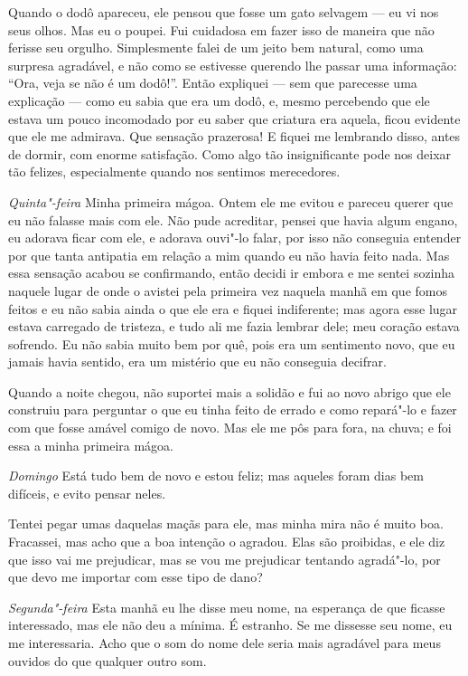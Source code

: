 Quando o dodô apareceu, ele pensou que fosse um gato selvagem --- eu vi nos seus
olhos. Mas eu o poupei. Fui cuidadosa em fazer isso de maneira que não
ferisse seu orgulho. Simplesmente falei de um jeito bem natural, como uma
surpresa agradável, e não como se estivesse querendo lhe passar uma informação:
“Ora, veja se não é um dodô!”. Então expliquei --- sem que parecesse uma
explicação --- como eu sabia que era um dodô, e, mesmo percebendo que ele estava um
pouco incomodado por eu saber que criatura era aquela, ficou evidente que ele
me admirava. Que sensação prazerosa! E fiquei me lembrando disso, antes de dormir, 
com enorme satisfação. Como algo tão insignificante pode
nos deixar tão felizes, especialmente quando nos sentimos merecedores.

\textit{Quinta"-feira} Minha primeira mágoa. Ontem ele me evitou e pareceu querer
que eu não falasse mais com ele. Não pude acreditar, pensei que havia
algum engano, eu adorava ficar com ele, e adorava ouvi"-lo falar, por
isso não conseguia entender por que tanta antipatia em relação a mim
quando eu não havia feito nada. Mas essa sensação acabou se confirmando,
então decidi ir embora e me sentei sozinha naquele lugar de onde o avistei
pela primeira vez naquela manhã em que fomos feitos e eu não sabia ainda o que
ele era e fiquei indiferente; mas agora esse lugar estava carregado de tristeza, 
e tudo ali me fazia lembrar dele; meu coração estava sofrendo. Eu não sabia muito
bem por quê, pois era um sentimento novo, que eu jamais havia sentido,
era um mistério que eu não conseguia decifrar.

Quando a noite chegou, não suportei mais a solidão e fui ao novo abrigo
que ele construiu para perguntar o que eu tinha feito de errado e como repará"-lo 
e fazer com que fosse amável comigo de novo. Mas ele me pôs
para fora, na chuva; e foi essa a minha primeira mágoa.

\textit{Domingo} Está tudo bem de novo e estou feliz; mas aqueles foram
dias bem difíceis, e evito pensar neles.

Tentei pegar umas daquelas maçãs para ele, mas minha mira não é muito boa.
Fracassei, mas acho que a boa intenção o agradou. Elas são proibidas, e ele diz
que isso vai me prejudicar, mas se vou me prejudicar tentando agradá"-lo, por que 
devo me importar com esse tipo de dano?

\textit{Segunda"-feira} Esta manhã eu lhe disse meu nome, na esperança de que ficasse
interessado, mas ele não deu a mínima. É estranho. Se me dissesse seu nome,
eu me interessaria. Acho que o som do nome dele seria mais agradável para meus
ouvidos do que qualquer outro som.

